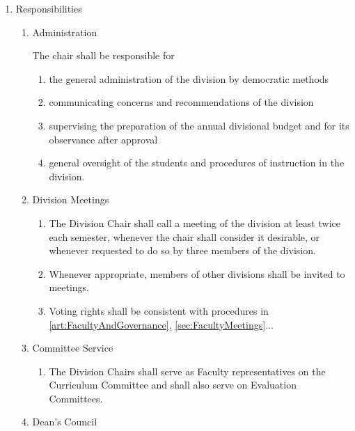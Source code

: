 \documentclass{manual}
\newcommand{\itemLevelA}{\alph*.}
\newcommand{\itemLevelB}{\arabic*)}
\newcommand{\itemLevelC}{\alph*)}
\newcommand{\itemRefA}{\alph*}
\newcommand{\itemRefB}{\arabic*}
\newcommand{\itemRefC}{\alph*}
\begin{document}
\begin{enumerate}[label=\itemLevelA,ref=\itemRefA]
				\item \label{item:responsibilities01} Responsibilities

					\begin{enumerate}[label=\itemLevelB,ref=\itemRefB]
					\item Administration

						The chair shall be responsible for

						\begin{enumerate}[label=\itemLevelC,ref=\itemRefC]
						\item the general administration of the division by democratic methods
						\item communicating concerns and recommendations of the division
						\item supervising the preparation of the annual divisional budget and for its observance after approval
						\item general oversight of the students and procedures of instruction in the division.
						\end{enumerate}
				
					\item Division Meetings

						\begin{enumerate}[label=\itemLevelC,ref=\itemRefC]
						\item The Division Chair shall call a meeting of the division at least twice each semester, whenever the chair shall consider it desirable, or whenever requested to do so by three members of the division.
						\item Whenever appropriate, members of other divisions shall be invited to meetings.
						\item Voting rights shall be consistent with procedures in \cref{art:FacultyAndGovernance}, \cref{sec:FacultyMeetings}...
						\end{enumerate}
				
					\item Committee Service

						\begin{enumerate}[label=\itemLevelC,ref=\itemRefC]
						\item The Division Chairs shall serve as Faculty representatives on the Curriculum Committee and shall also serve on Evaluation Committees. 
						\end{enumerate}
				
					\item \label{iitem:deansCouncil02} Dean's Council


\end{enumerate}
\end{enumerate}
\end{document}
